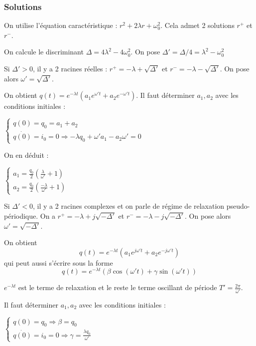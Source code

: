 \documentclass[french]{yLectureNote}
\begin{document}
\subsubsection{Solutions}
On utilise l'équation caractéristique : \(r^2+2\lambda r+\omega_0^2\). Cela admet 2 solutions \(r^+ \) et \(r^-\).

On calcule le discriminant \(\Delta  = 4\lambda^2-4\omega_0^2\). On pose \(\Delta' = \Delta/4 = \lambda^2-\omega_0^2\)

Si \(\Delta'>0\), il y a 2 racines réelles : \(r^+ = -\lambda +\sqrt{\Delta'}\) et \(r^- = -\lambda -\sqrt{\Delta'}\). On pose alors \(\omega' = \sqrt{\Delta'}\).

On obtient \(q(t) = e^{-\lambda t}(a_1e^{\omega't}+a_2e^{-\omega't})\). Il faut déterminer \(a_1,a_2\) avec les conditions initiales :

\( \left\{\begin{matrix}
q(0) = q_0 = a_1+a_2\\
\dot{q(0)} = i_0 = 0 \Rightarrow -\lambda q_0+\omega'a_1-a_2\omega'=0
\end{matrix}\right.\)

On en déduit :

\( \left\{\begin{matrix}
a_1 = \frac{q_0}{2}(\frac{\lambda}{\omega'}+1)\\
a_2 = \frac{q_0}{2}(\frac{-\lambda}{\omega'}+1)
\end{matrix}\right.\)

Si \(\Delta'<0\), il y a 2 racines complexes et on parle de régime de relaxation pseudo-périodique. On a \(r^+ = -\lambda +j\sqrt{-\Delta'}\) et \(r^- = -\lambda -j\sqrt{-\Delta'}\). On pose alors \(\omega' = \sqrt{-\Delta'}\).

On obtient \[q(t) = e^{-\lambda t}(a_1e^{j\omega't}+a_2e^{-j\omega't})\] qui peut aussi s'écrire sous la forme \[q(t) = e^{-\lambda t}(\beta\cos(\omega't)+\gamma\sin(\omega't))\]

\(e^{-\lambda t}\) est le terme de relaxation et le reste le terme oscillant de période \(T' = \frac{2\pi}{\omega'}\).

Il faut déterminer \(a_1,a_2\) avec les conditions initiales :

\( \left\{\begin{matrix}
q(0) = q_0 \Rightarrow \beta = q_0\\
\dot{q(0)} = i_0 = 0\Rightarrow \gamma = \frac{\lambda q_0}{\omega'}
\end{matrix}\right.\)
\end{document}

